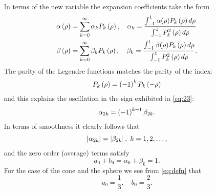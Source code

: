 \documentclass[preprint,12pt]{elsarticle}
\begin{document}
In terms of the new variable the expansion coefficients take the form
  \begin{equation}
    \begin{split}
    \alpha\paren{\rho} & = \sum_{k=0}^{\infty} \alpha_{k} P_{k}\paren{\rho}, 
     \quad \alpha_{k} = \frac{\int_{-1}^{1}\alpha(\rho) P_{k}\paren{\rho} d\rho}{\int_{-1}^{1} P_{k}^{2}\paren{\rho} d\rho} \\
%
    \beta\paren{\rho} & = \sum_{k=0}^{\infty} \beta_{k} P_{k}\paren{\rho}, 
     \quad \beta_{k} = \frac{\int_{-1}^{1}\beta(\rho) P_{k}\paren{\rho} d\rho}{\int_{-1}^{1} P_{k}^{2}\paren{\rho} d\rho}.
    \end{split}
    \label{eq:defn}
  \end{equation}
The parity of the Legendre functions matches the parity of the index:
\begin{equation}
  P_{k}\left( \rho \right) = \left( -1 \right)^{k} P_{k}\left( -\rho \right)
\end{equation}
and this explains the oscillation in the sign exhibited in \eqref{eq:23}:
\begin{equation}
  \alpha_{2k} = \left( -1 \right)^{k+1} \beta_{2k}.
  \label{eq:equals}
\end{equation}
In terms of smoothness it clearly follows that
\begin{equation}
  \left|\alpha_{2k}\right| = \left|\beta_{2k}\right|,\ k=1,2,\dots,
  \label{eq:canona}
\end{equation}
and the zero order (average) terms satisfy
\begin{equation}
  a_{0} + b_{0} = \alpha_{0} + \beta_{0} = 1.
  \label{eq:canonb}
\end{equation}
For the case of the cone and the sphere we see from \eqref{eq:defn} that 
\begin{equation}
  a_{0} = \frac{1}{3}, \quad
  b_{0} = \frac{2}{3}.
\end{equation}

\end{document}
